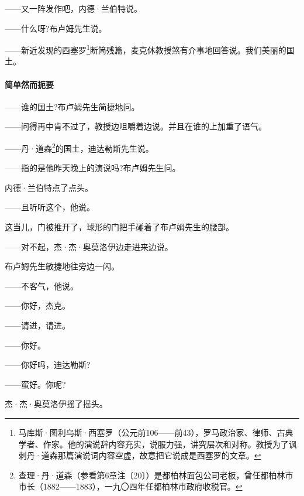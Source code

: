 \par ——又一阵发作吧，内德·兰伯特说。
\par ——什么呀?布卢姆先生说。
\par ——新近发现的西塞罗\footnote{马库斯·图利乌斯·西塞罗（公元前106——前43），罗马政治家、律师、古典学者、作家。他的演说辞内容充实，说服力强，讲究层次和对称。教授为了讽刺丹·道森那篇演说词内容空虚，故意把它说成是西塞罗的文章。}断简残篇，麦克休教授煞有介事地回答说。我们美丽的国土。
\paragraph*{简单然而扼要}
\par ——谁的国土?布卢姆先生简捷地问。
\par ——问得再中肯不过了，教授边咀嚼着边说。并且在谁的上加重了语气。
\par ——丹·道森\footnote{查理·丹·道森（参看第6章注〔20〕）是都柏林面包公司老板，曾任都柏林市市长（1882——1883），一九〇四年任都柏林市政府收税官。}的国土，迪达勒斯先生说。
\par ——指的是他昨天晚上的演说吗?布卢姆先生问。
\par 内德·兰伯特点了点头。
\par ——且听听这个，他说。
\par 这当儿，门被推开了，球形的门把手碰着了布卢姆先生的腰部。
\par ——对不起，杰·杰·奥莫洛伊边走进来边说。
\par 布卢姆先生敏捷地往旁边一闪。
\par ——不客气，他说。
\par ——你好，杰克。
\par ——请进，请进。
\par ——你好。
\par ——你好吗，迪达勒斯?
\par ——蛮好。你呢?
\par 杰·杰·奥莫洛伊摇了摇头。
